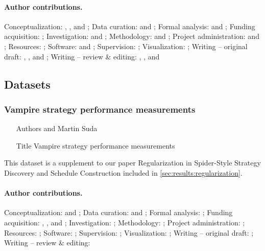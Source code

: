 \paragraph{Author contributions.}
Conceptualization:            \MS{}, \KC{}, and \FB{};
Data curation:                \MS{} and \KC{};
Formal analysis:              \MS{} and \KC{};
Funding acquisition:          \MS{};
Investigation:                \KC{} and \MS{};
Methodology:                  \MS{} and \KC{};
Project administration:       \MS{} and \FB{};
Resources:                    \JU{};
Software:                     \KC{} and \MS{};
Supervision:                  \MS{};
Visualization:                \MS{};
Writing -- original draft:    \MS{}, \KC{}, and \FB{};
Writing -- review \& editing: \FB{}, \MS{}, and \KC{}

\subsection{Datasets}

\subsubsection{Vampire strategy performance measurements}

\begin{itemize}
\item[Authors]  and Martin Suda
\item[Title] Vampire strategy performance measurements \cite{bartek10814478}
\end{itemize}

This dataset is a supplement to our paper
Regularization in Spider-Style Strategy Discovery and Schedule Construction
\cite{DBLP:conf/ijcar/BartekCS24}
included in \cref{sec:results:regularization}.

\paragraph{Author contributions.}
Conceptualization:            \FB{} and \MS{};
Data curation:                \FB{} and \MS{};
Formal analysis:              \FB{};
Funding acquisition:          \MS{}, \JU{}, and \FB{};
Investigation:                \FB{};
Methodology:                  \FB{};
Project administration:       \MS{};
Resources:                    \JU{};
Software:                     \FB{};
Supervision:                  \MS{};
Visualization:                \FB{};
Writing -- original draft:    \FB{};
Writing -- review \& editing:~\MS{}
